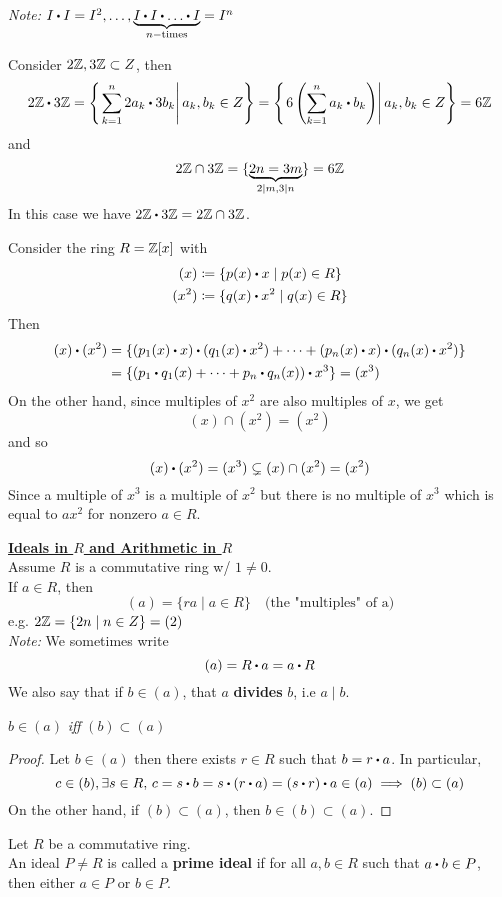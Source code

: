 \documentclass[../Main.tex]{subfiles}
\begin{document}
\textit{Note:} $I\rdot I=I^2, \dots, \underbrace{I\rdot I\rdot \dots \rdot I}_{n-\text{times}}=I^n$
\begin{example}
	Consider $2\mathbb{Z}, 3\mathbb{Z} \subset Z$, then
	\[2\Z\rdot 3\Z = \left\{ \left. \sum_{k=1}^n 2a_k\rdot 3b_k\right| a_k,b_k\in Z\right\} = \left\{ \left.6\left(\sum_{k=1}^n a_k\rdot b_k\right)\right| a_k,b_k\in Z\right\}=6\Z\]
	and
	\[2\mathbb{Z}\cap 3\mathbb{Z} = \{\underbrace{2n=3m}_{2|m,3|n}\}=6\mathbb{Z}\]
In this case we have $2\Z\rdot 3\Z=2\Z\cap 3\Z$.
\end{example}
\newpage
\begin{example}
	Consider the ring $R=\mathbb{Z}[x]$ with
	\begin{align*}
	(x)&\coloneqq\{p(x)\rdot x\mid p(x)\in R\}\\
	(x^2)&\coloneqq \{q(x)\rdot x^2\mid q(x)\in R\}
	\end{align*}
	Then
	\begin{align*}
	(x)\rdot (x^2)&=\{(p_1(x)\rdot x)\rdot (q_1(x)\rdot x^2)+\dots+(p_n(x)\rdot x)\rdot (q_n(x)\rdot x^2)\}\\ &= \{(p_1\rdot q_1(x)+\dots+p_n\rdot q_n(x))\rdot x^3\}=(x^3)
	\end{align*}
	On the other hand, since multiples of $x^2$ are also multiples of $x$, we get
	\[(x)\cap(x^2) = (x^2)\]
	and so
	\[(x)\rdot (x^2)=(x^3)\subsetneq(x)\cap(x^2)=(x^2)\]
	Since a multiple of $x^3$ is a multiple of $x^2$ but there is no multiple of $x^3$ which is equal to $ax^2$ for nonzero $a \in R$.
\end{example}
\underline{\textbf{\Large Ideals in $R$ and Arithmetic in $R$}}~\\
Assume $R$ is a commutative ring w/ $1\ne 0$. \\
If $a\in R$, then
\[(a)=\{ra\mid a\in R\} \quad \text{(the "multiples" of a)}\]
e.g. $2\mathbb{Z}=\{2n\mid n\in Z\}=(2)$\\
\textit{Note:} We sometimes write
\[(a)=R\rdot a=a\rdot R\]
We also say that if $b\in (a)$, that $a$ \textbf{divides} $b$, i.e $a\mid b$.
\begin{claim}
	$b\in (a)$ \textit{iff} $(b) \subset (a)$
\end{claim}
\begin{proof}
	Let $b\in (a)$ then there exists $r\in R$ such that $b=r\rdot a$. In particular,
	\[c\in (b), \exists s\in R, \, c=s\rdot b=s\rdot (r\rdot a)=(s\rdot r)\rdot a\in (a)\implies (b) \subset (a)\]
	On the other hand, if $(b)\subset (a)$, then $b\in (b) \subset (a)$.
\end{proof}
\begin{dfn}[title = Prime Ideal]
	Let $R$ be a commutative ring.\\
	An ideal $P\ne R$ is called a \textbf{prime ideal} if for all $a,b\in R$ such that $a\rdot b\in P$, then either $a\in P$ or $b\in P$.
\end{dfn}
\end{document}
